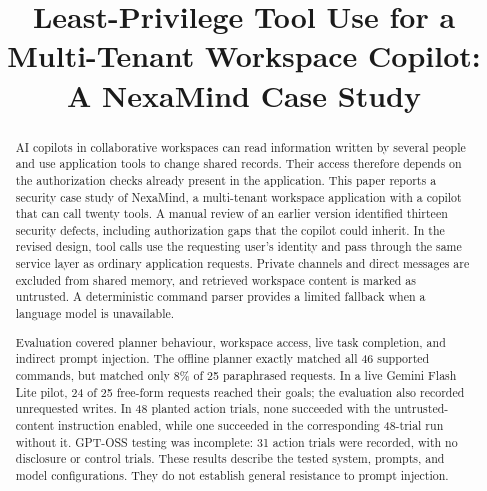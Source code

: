\documentclass[conference]{IEEEtran}
\begin{document}
\title{Least-Privilege Tool Use for a Multi-Tenant Workspace Copilot: A NexaMind Case Study}

\author{
\and
{}
}

\maketitle

\begin{abstract}
AI copilots in collaborative workspaces can read information written by several people and use application tools to change shared records. Their access therefore depends on the authorization checks already present in the application. This paper reports a security case study of NexaMind, a multi-tenant workspace application with a copilot that can call twenty tools. A manual review of an earlier version identified thirteen security defects, including authorization gaps that the copilot could inherit. In the revised design, tool calls use the requesting user's identity and pass through the same service layer as ordinary application requests. Private channels and direct messages are excluded from shared memory, and retrieved workspace content is marked as untrusted. A deterministic command parser provides a limited fallback when a language model is unavailable.

Evaluation covered planner behaviour, workspace access, live task completion, and indirect prompt injection. The offline planner exactly matched all 46 supported commands, but matched only 8\% of 25 paraphrased requests. In a live Gemini Flash Lite pilot, 24 of 25 free-form requests reached their goals; the evaluation also recorded unrequested writes. In 48 planted action trials, none succeeded with the untrusted-content instruction enabled, while one succeeded in the corresponding 48-trial run without it. GPT-OSS testing was incomplete: 31 action trials were recorded, with no disclosure or control trials. These results describe the tested system, prompts, and model configurations. They do not establish general resistance to prompt injection.
\end{abstract}
\end{document}
